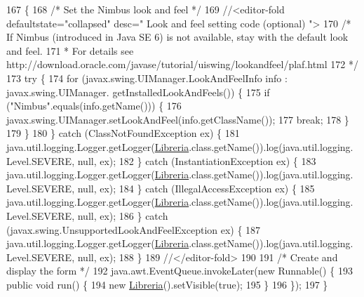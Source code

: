 \begin{DoxyCode}
167                                            \{
168         \textcolor{comment}{/* Set the Nimbus look and feel */}
169         \textcolor{comment}{//<editor-fold defaultstate="collapsed" desc=" Look and feel setting code (optional) ">}
170         \textcolor{comment}{/* If Nimbus (introduced in Java SE 6) is not available, stay with the default look and feel.}
171 \textcolor{comment}{         * For details see http://download.oracle.com/javase/tutorial/uiswing/lookandfeel/plaf.html }
172 \textcolor{comment}{         */}
173         \textcolor{keywordflow}{try} \{
174             \textcolor{keywordflow}{for} (javax.swing.UIManager.LookAndFeelInfo info : javax.swing.UIManager.
      getInstalledLookAndFeels()) \{
175                 \textcolor{keywordflow}{if} (\textcolor{stringliteral}{"Nimbus"}.equals(info.getName())) \{
176                     javax.swing.UIManager.setLookAndFeel(info.getClassName());
177                     \textcolor{keywordflow}{break};
178                 \}
179             \}
180         \} \textcolor{keywordflow}{catch} (ClassNotFoundException ex) \{
181             java.util.logging.Logger.getLogger(\mbox{\hyperlink{classpecl3ignacioriberasemaforos_1_1_libreria_ae14b9cc89b983b16f50e1b9cb1d08949}{Libreria}}.class.getName()).log(java.util.logging.
      Level.SEVERE, null, ex);
182         \} \textcolor{keywordflow}{catch} (InstantiationException ex) \{
183             java.util.logging.Logger.getLogger(\mbox{\hyperlink{classpecl3ignacioriberasemaforos_1_1_libreria_ae14b9cc89b983b16f50e1b9cb1d08949}{Libreria}}.class.getName()).log(java.util.logging.
      Level.SEVERE, null, ex);
184         \} \textcolor{keywordflow}{catch} (IllegalAccessException ex) \{
185             java.util.logging.Logger.getLogger(\mbox{\hyperlink{classpecl3ignacioriberasemaforos_1_1_libreria_ae14b9cc89b983b16f50e1b9cb1d08949}{Libreria}}.class.getName()).log(java.util.logging.
      Level.SEVERE, null, ex);
186         \} \textcolor{keywordflow}{catch} (javax.swing.UnsupportedLookAndFeelException ex) \{
187             java.util.logging.Logger.getLogger(\mbox{\hyperlink{classpecl3ignacioriberasemaforos_1_1_libreria_ae14b9cc89b983b16f50e1b9cb1d08949}{Libreria}}.class.getName()).log(java.util.logging.
      Level.SEVERE, null, ex);
188         \}
189         \textcolor{comment}{//</editor-fold>}
190 
191         \textcolor{comment}{/* Create and display the form */}
192         java.awt.EventQueue.invokeLater(\textcolor{keyword}{new} Runnable() \{
193             \textcolor{keyword}{public} \textcolor{keywordtype}{void} run() \{
194                 \textcolor{keyword}{new} \mbox{\hyperlink{classpecl3ignacioriberasemaforos_1_1_libreria_ae14b9cc89b983b16f50e1b9cb1d08949}{Libreria}}().setVisible(\textcolor{keyword}{true});
195             \}
196         \});
197     \}
\end{DoxyCode}


